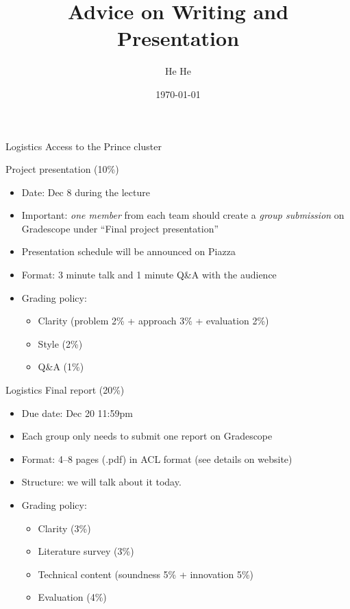 \documentclass[usenames,dvipsnames,notes]{beamer}
\title[CSCI-GA.2590]{Advice on Writing and Presentation}
\author[He He]{He He
}
\institute[NYU]{New York University}
\date{\today}
\begin{document}
\begin{frame}
\titlepage
\end{frame}

\begin{frame}
    {Logistics}
    Access to the Prince cluster

    Project presentation (10\%)\\
    \begin{itemize}
        \item Date: Dec 8 during the lecture
        \item Important: \emph{one member} from each team should create a \emph{group submission} on Gradescope under ``Final project presentation''
        \item Presentation schedule will be announced on Piazza
        \item Format: 3 minute talk and 1 minute Q\&A with the audience
        \item Grading policy:
            \begin{itemize}
                \item Clarity (problem 2\% + approach 3\% + evaluation 2\%)
                \item Style (2\%)
                \item Q\&A (1\%)
            \end{itemize}
    \end{itemize}
\end{frame}

\begin{frame}
    {Logistics}
    Final report (20\%)\\
    \begin{itemize}
        \item Due date: Dec 20 11:59pm
        \item Each group only needs to submit one report on Gradescope
        \item Format: 4--8 pages (.pdf) in ACL format (see details on website)
        \item Structure: we will talk about it today.
        \item Grading policy:
            \begin{itemize}
                \item Clarity (3\%)
                \item Literature survey (3\%)
                \item Technical content (soundness 5\% + innovation 5\%) 
                \item Evaluation (4\%)
            \end{itemize}
    \end{itemize}
\end{frame}
\end{document}
